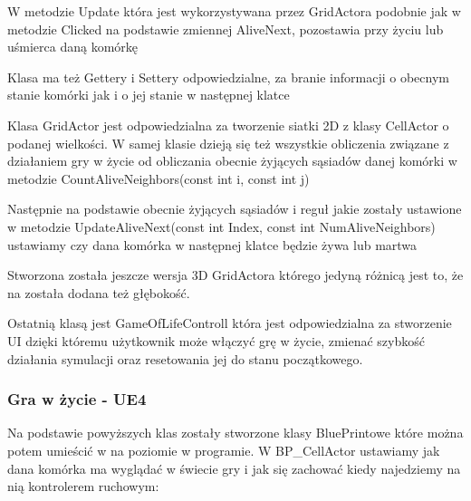 \documentclass[a4paper,12pt,reqno]{article}
\begin{document}
W metodzie Update która jest wykorzystywana przez GridActora podobnie jak w metodzie Clicked na podstawie zmiennej AliveNext, pozostawia przy życiu lub uśmierca daną komórkę



Klasa ma też Gettery i Settery odpowiedzialne, za branie informacji o obecnym stanie komórki jak i o jej stanie w następnej klatce



Klasa GridActor jest odpowiedzialna za tworzenie siatki 2D z klasy CellActor o podanej wielkości. W samej klasie dzieją się też wszystkie obliczenia związane z działaniem gry w życie od obliczania obecnie żyjących sąsiadów danej komórki w metodzie CountAliveNeighbors(const int i, const int j)



Następnie na podstawie obecnie żyjących sąsiadów i reguł jakie zostały ustawione w metodzie UpdateAliveNext(const int Index, const int NumAliveNeighbors) ustawiamy czy dana komórka w następnej klatce będzie żywa lub martwa




Stworzona została jeszcze wersja 3D GridActora którego jedyną różnicą jest to, że na została dodana też głębokość.

Ostatnią klasą jest GameOfLifeControll która jest odpowiedzialna
za stworzenie UI dzięki któremu użytkownik może włączyć grę w życie, zmienać szybkość działania symulacji oraz resetowania jej do stanu początkowego.

\subsubsection{Gra w życie - UE4}

Na podstawie powyższych klas zostały stworzone klasy BluePrintowe które można potem umieścić w na poziomie w programie. W BP\_CellActor ustawiamy jak dana komórka ma wyglądać w świecie gry i jak się zachować kiedy najedziemy na nią kontrolerem ruchowym:
\end{document}
